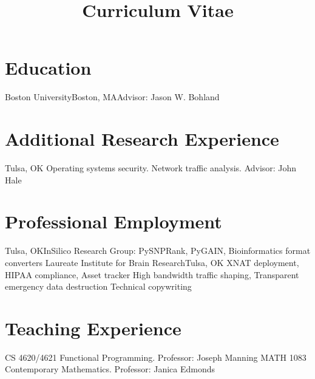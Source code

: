 \documentclass[11pt,letterpaper,serif]{moderncv}
\title{Curriculum Vitae}
\begin{document}
\makecvtitle

\section{Education}
%
    {Boston University}{Boston, MA}{}{Advisor: Jason W. Bohland}

\section{Additional Research Experience}
%
    {Tulsa, OK}{}%
    {Operating systems security. Network traffic analysis. Advisor: John Hale}

\section{Professional Employment}
%
    {Tulsa, OK}{}{InSilico Research Group: PySNPRank, PyGAIN, Bioinformatics format converters}
%
    {Laureate Institute for Brain Research}{Tulsa, OK}{}%
    {XNAT deployment, HIPAA compliance, Asset tracker}
%
    {High bandwidth traffic shaping, Transparent emergency data destruction}
%
    {Technical copywriting}

\section{Teaching Experience}
%
    {CS 4620/4621 Functional Programming. Professor: Joseph Manning}
%
    {MATH 1083 Contemporary Mathematics. Professor: Janica Edmonds}
\end{document}
